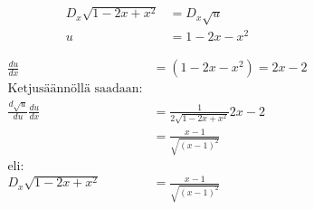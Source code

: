 \documentclass{article}
\begin{document}
\subsection{}

\begin{align*}
    D_x \sqrt{1 - 2x + x^2} &= D_x \sqrt{u}\\
    u &= 1 - 2x - x^2
\end{align*}


\begin{align*}
    \frac{du}{dx} &= (1 - 2x - x^2) = 2x - 2\\
    \text{Ketjusäännöllä saadaan:}\\
    \frac{d \sqrt{u}}{du} \frac{du}{dx} &= \frac{1}{2 \sqrt{1 - 2x + x^2}} 2x - 2\\
    &= \frac{x - 1}{\sqrt{(x - 1)^2}}\\
    \text{eli:}\\
    D_x \sqrt{1 - 2x + x^2} &= \frac{x - 1}{\sqrt{(x - 1)^2}}\\
\end{align*}
\end{document}
